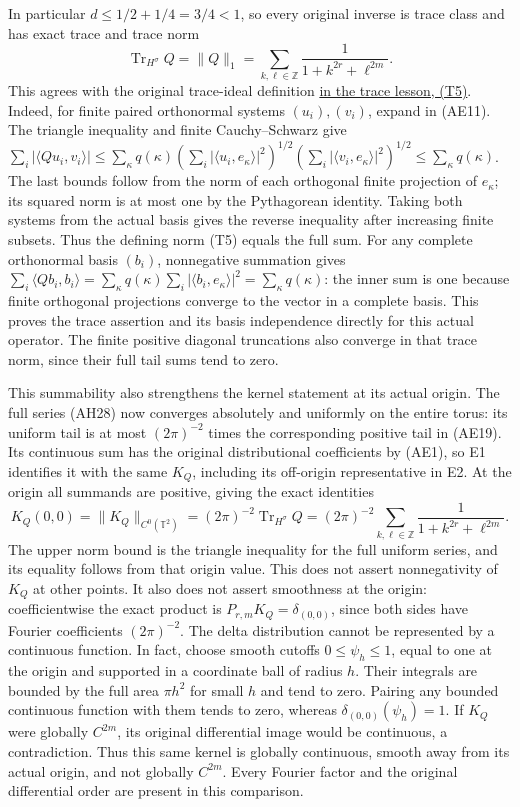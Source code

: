 \documentclass[
  11pt,
]{article}
\begin{document}
In particular \(d\leq1/2+1/4=3/4<1\), so every original inverse is trace
class and has exact trace and trace norm \[
 \operatorname{Tr}_{H^\sigma}Q=\|Q\|_1
                  =\sum_{k,\ell\in\mathbb Z}
                       \frac1{1+k^{2r}+\ell^{2m}}.
 \tag{AE19}
\] This agrees with the original trace-ideal definition
\href{traces-and-complexes.pdf\#section*.11}{in
the trace lesson, (T5)}. Indeed, for finite paired orthonormal systems
\((u_i),(v_i)\), expand in (AE11). The triangle inequality and finite
Cauchy--Schwarz give \(\sum_i|\langle Qu_i,v_i\rangle|
\leq\sum_\kappa q(\kappa)
(\sum_i|\langle u_i,e_\kappa\rangle|^2)^{1/2}
(\sum_i|\langle v_i,e_\kappa\rangle|^2)^{1/2}
\leq\sum_\kappa q(\kappa)\). The last bounds follow from the norm of
each orthogonal finite projection of \(e_\kappa\); its squared norm is
at most one by the Pythagorean identity. Taking both systems from the
actual basis gives the reverse inequality after increasing finite
subsets. Thus the defining norm (T5) equals the full sum. For any
complete orthonormal basis \((b_i)\), nonnegative summation gives
\(\sum_i\langle Qb_i,b_i\rangle
=\sum_\kappa q(\kappa)\sum_i|\langle b_i,e_\kappa\rangle|^2
=\sum_\kappa q(\kappa)\): the inner sum is one because finite orthogonal
projections converge to the vector in a complete basis. This proves the
trace assertion and its basis independence directly for this actual
operator. The finite positive diagonal truncations also converge in that
trace norm, since their full tail sums tend to zero.

This summability also strengthens the kernel statement at its actual
origin. The full series (AH28) now converges absolutely and uniformly on
the entire torus: its uniform tail is at most \((2\pi)^{-2}\) times the
corresponding positive tail in (AE19). Its continuous sum has the
original distributional coefficients by (AE1), so E1 identifies it with
the same \(K_Q\), including its off-origin representative in E2. At the
origin all summands are positive, giving the exact identities \[
 K_Q(0,0)=\|K_Q\|_{C^0(\mathbb T^2)}
       =(2\pi)^{-2}\operatorname{Tr}_{H^\sigma}Q
       =(2\pi)^{-2}\sum_{k,\ell\in\mathbb Z}
                   \frac1{1+k^{2r}+\ell^{2m}}.
 \tag{AE20}
\] The upper norm bound is the triangle inequality for the full uniform
series, and its equality follows from that origin value. This does not
assert nonnegativity of \(K_Q\) at other points. It also does not assert
smoothness at the origin: coefficientwise the exact product is
\(P_{r,m}K_Q=\delta_{(0,0)}\), since both sides have Fourier
coefficients \((2\pi)^{-2}\). The delta distribution cannot be
represented by a continuous function. In fact, choose smooth cutoffs
\(0\leq\psi_h\leq1\), equal to one at the origin and supported in a
coordinate ball of radius \(h\). Their integrals are bounded by the full
area \(\pi h^2\) for small \(h\) and tend to zero. Pairing any bounded
continuous function with them tends to zero, whereas
\(\delta_{(0,0)}(\psi_h)=1\). If \(K_Q\) were globally \(C^{2m}\), its
original differential image would be continuous, a contradiction. Thus
this same kernel is globally continuous, smooth away from its actual
origin, and not globally \(C^{2m}\). Every Fourier factor and the
original differential order are present in this comparison.
\end{document}
